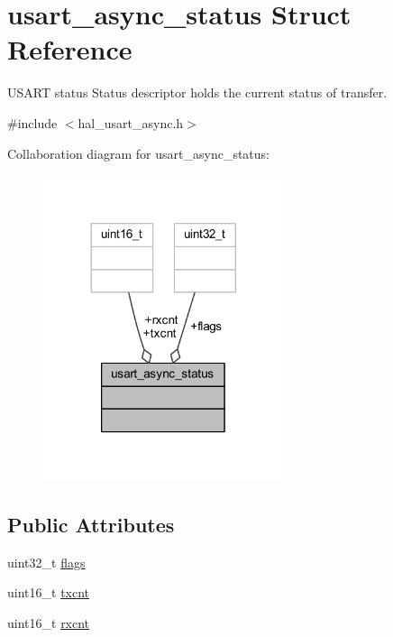 \hypertarget{structusart__async__status}{}\section{usart\+\_\+async\+\_\+status Struct Reference}
\label{structusart__async__status}


U\+S\+A\+RT status Status descriptor holds the current status of transfer.  




{\ttfamily \#include $<$hal\+\_\+usart\+\_\+async.\+h$>$}



Collaboration diagram for usart\+\_\+async\+\_\+status\+:
\nopagebreak
\begin{figure}[H]
\begin{center}
\leavevmode
\includegraphics[width=200pt]{structusart__async__status__coll__graph}
\end{center}
\end{figure}
\subsection*{Public Attributes}
\begin{DoxyCompactItemize}
\item 
uint32\+\_\+t \hyperlink{structusart__async__status_a6d85ac04ed76a86bb9c49bb45a848d9a}{flags}
\item 
uint16\+\_\+t \hyperlink{structusart__async__status_a5680433094528c4ff7bcd49fba77e970}{txcnt}
\item 
uint16\+\_\+t \hyperlink{structusart__async__status_ac32698399322fed11e6914cbd88f5ee5}{rxcnt}
\end{DoxyCompactItemize}


